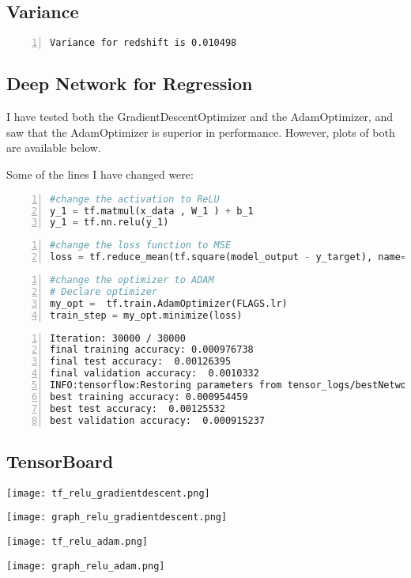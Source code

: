 \subsection{Variance}
\begin{lstlisting}[language={},numbers=left,numberstyle=\tiny,frame = single]
Variance for redshift is 0.010498
\end{lstlisting}
\subsection{Deep Network for Regression}
I have tested both the GradientDescentOptimizer and the AdamOptimizer, and saw that the AdamOptimizer is superior in performance. However, plots of both are available below.

Some of the lines I have changed were:

\begin{lstlisting}[language=python,numbers=left,numberstyle=\tiny,frame=single,breaklines=true,postbreak=\mbox{\textcolor{red}{$\hookrightarrow$}\space}]
#change the activation to ReLU
y_1 = tf.matmul(x_data , W_1 ) + b_1
y_1 = tf.nn.relu(y_1)
\end{lstlisting}

\begin{lstlisting}[language=python,numbers=left,numberstyle=\tiny,frame=single,breaklines=true,postbreak=\mbox{\textcolor{red}{$\hookrightarrow$}\space}]
#change the loss function to MSE
loss = tf.reduce_mean(tf.square(model_output - y_target), name='mean_squared_error')
\end{lstlisting}

\begin{lstlisting}[language=python,numbers=left,numberstyle=\tiny,frame=single,breaklines=true,postbreak=\mbox{\textcolor{red}{$\hookrightarrow$}\space}]
#change the optimizer to ADAM
# Declare optimizer
my_opt =  tf.train.AdamOptimizer(FLAGS.lr)
train_step = my_opt.minimize(loss)
\end{lstlisting}


\begin{lstlisting}[language={},numbers=left,numberstyle=\tiny,frame=single,breaklines=true,postbreak=\mbox{\textcolor{red}{$\hookrightarrow$}\space}]
Iteration: 30000 / 30000
final training accuracy: 0.000976738
final test accuracy:  0.00126395 
final validation accuracy:  0.0010332
INFO:tensorflow:Restoring parameters from tensor_logs/bestNetwork
best training accuracy: 0.000954459 
best test accuracy:  0.00125532 
best validation accuracy:  0.000915237
\end{lstlisting}


\subsection{TensorBoard}

\texttt{[image: tf\_relu\_gradientdescent.png]}

\texttt{[image: graph\_relu\_gradientdescent.png]}

\texttt{[image: tf\_relu\_adam.png]}

\texttt{[image: graph\_relu\_adam.png]}